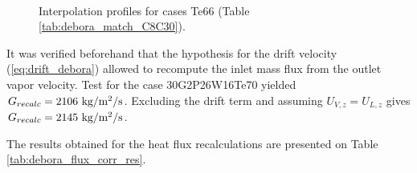 \begin{figure}[h!]
\centering

\\

\caption{Interpolation profiles for cases Te66 (Table \ref{tab:debora_match_C8C30}).}
\label{fig:debora_interpol}
\end{figure}

\npar
\begin{remark*}{}
It was verified beforehand that the hypothesis for the drift velocity (\ref{eq:drift_debora}) allowed to recompute the inlet mass flux from the outlet vapor velocity. Test for the case 30G2P26W16Te70 yielded $G_{recalc}=2106~\text{kg/m$^{2}$/s}$. Excluding the drift term and assuming $U_{V,z}=U_{L,z}$ gives $G_{recalc}=2145~\text{kg/m$^{2}$/s}$.
\end{remark*}

\npar


The results obtained for the heat flux recalculations are presented on Table \ref{tab:debora_flux_corr_res}.

